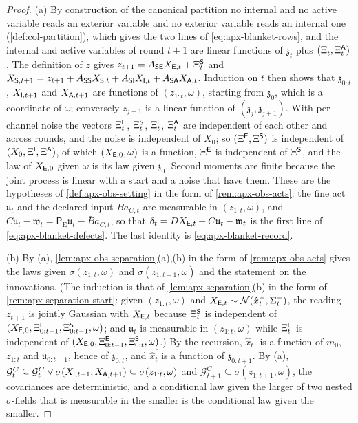\begin{proof}
(a) By construction of the canonical partition no internal and no active variable reads an exterior variable and no exterior variable reads an internal one (\cref{def:col-partition}), which gives the two lines of \eqref{eq:apx-blanket-rows}, and the internal and active variables of round $t+1$ are linear functions of $\mathfrak z_t$ plus $(\Xi^{\mathsf{I}}_t,\Xi^{\mathsf{A}}_t)$. The definition of $z$ gives $z_{t+1}=A_{\mathsf{S}\mathsf{E}}X_{\mathsf{E},t}+\Xi^{\mathsf{S}}_t$ and $X_{\mathsf{S},t+1}=z_{t+1}+A_{\mathsf{S}\mathsf{S}}X_{\mathsf{S},t}+A_{\mathsf{S}\mathsf{I}}X_{\mathsf{I},t}+A_{\mathsf{S}\mathsf{A}}X_{\mathsf{A},t}$. Induction on $t$ then shows that $\mathfrak z_{0:t}$, $X_{\mathsf{I},t+1}$ and $X_{\mathsf{A},t+1}$ are functions of $(z_{1:t},\omega)$, starting from $\mathfrak z_0$, which is a coordinate of $\omega$; conversely $z_{j+1}$ is a linear function of $(\mathfrak z_j,\mathfrak z_{j+1})$. With per-channel noise the vectors $\Xi^{\mathsf{E}}_t$, $\Xi^{\mathsf{S}}_t$, $\Xi^{\mathsf{I}}_t$, $\Xi^{\mathsf{A}}_t$ are independent of each other and across rounds, and the noise is independent of $X_0$; so $(\Xi^{\mathsf{E}},\Xi^{\mathsf{S}})$ is independent of $(X_0,\Xi^{\mathsf{I}},\Xi^{\mathsf{A}})$, of which $(X_{\mathsf{E},0},\omega)$ is a function, $\Xi^{\mathsf{E}}$ is independent of $\Xi^{\mathsf{S}}$, and the law of $X_{\mathsf{E},0}$ given $\omega$ is its law given $\mathfrak z_0$. Second moments are finite because the joint process is linear with a start and a noise that have them. These are the hypotheses of \cref{def:apx-obs-setting} in the form of \cref{rem:apx-obs-acts}: the fine act $\mathfrak u_t$ and the declared input $\bar Ba_{C,t}$ are measurable in $(z_{1:t},\omega)$, and $C\mathfrak u_t-\mathfrak w_t=\mathsf P_{\mathrm E}\mathfrak u_t-\bar Ba_{C,t}$, so that $\delta_t=DX_{\mathsf{E},t}+C\mathfrak u_t-\mathfrak w_t$ is the first line of \eqref{eq:apx-blanket-defects}. The last identity is \eqref{eq:apx-blanket-record}.

(b) By (a), \cref{lem:apx-obs-separation}(a),(b) in the form of \cref{rem:apx-obs-acts} gives the laws given $\sigma(z_{1:t},\omega)$ and $\sigma(z_{1:t+1},\omega)$ and the statement on the innovations. (The induction is that of \cref{lem:apx-separation}(b) in the form of \cref{rem:apx-separation-start}: given $(z_{1:t},\omega)$ and $X_{\mathsf{E},t}\sim\mathcal{N}(\hat x^-_t,\Sigma^-_t)$, the reading $z_{t+1}$ is jointly Gaussian with $X_{\mathsf{E},t}$ because $\Xi^{\mathsf{S}}_t$ is independent of $(X_{\mathsf{E},0},\Xi^{\mathsf{E}}_{0:t-1},\Xi^{\mathsf{S}}_{0:t-1},\omega)$; and $\mathfrak u_t$ is measurable in $(z_{1:t},\omega)$ while $\Xi^{\mathsf{E}}_t$ is independent of $(X_{\mathsf{E},0},\Xi^{\mathsf{E}}_{0:t-1},\Xi^{\mathsf{S}}_{0:t},\omega)$.) By the recursion, $\hat x^-_t$ is a function of $m_0$, $z_{1:t}$ and $\mathfrak u_{0:t-1}$, hence of $\mathfrak z_{0:t}$, and $\hat x^{\mathrm f}_t$ is a function of $\mathfrak z_{0:t+1}$. By (a), $\mathcal G^C_t\subseteq\mathcal G^C_t\vee\sigma(X_{\mathsf{I},t+1},X_{\mathsf{A},t+1})\subseteq\sigma(z_{1:t},\omega)$ and $\mathcal G^C_{t+1}\subseteq\sigma(z_{1:t+1},\omega)$, the covariances are deterministic, and a conditional law given the larger of two nested $\sigma$-fields that is measurable in the smaller is the conditional law given the smaller.


\end{proof}
